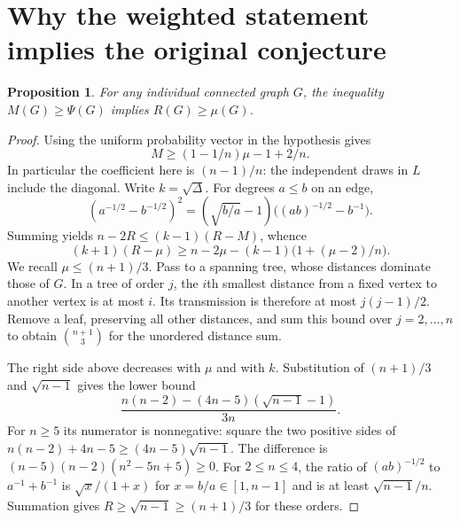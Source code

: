 \documentclass[11pt,a4paper]{article}
\newtheorem{proposition}[theorem]{Proposition}
\begin{document}
\section{Why the weighted statement implies the original conjecture}
\begin{proposition}\label{p11-prop:transfer}
For any individual connected graph $G$, the inequality $M(G)\ge\Psi(G)$ implies $R(G)\ge\mu(G)$.
\end{proposition}
\begin{proof}
Using the uniform probability vector in the hypothesis gives
\[
 M\ge(1-1/n)\mu-1+2/n.
\]
In particular the coefficient here is $(n-1)/n$: the independent draws in $L$ include the diagonal. Write $k=\sqrt\Delta$. For degrees $a\le b$ on an edge,
\[
 (a^{-1/2}-b^{-1/2})^2
 =(\sqrt{b/a}-1)\bigl((ab)^{-1/2}-b^{-1}\bigr).
\]
Summing yields $n-2R\le(k-1)(R-M)$, whence
\[
 (k+1)(R-\mu)\ge n-2\mu-(k-1)\bigl(1+(\mu-2)/n\bigr).
\]
We recall $\mu\le(n+1)/3$. Pass to a spanning tree, whose distances dominate those of $G$. In a tree of order $j$, the $i$th smallest distance from a fixed vertex to another vertex is at most $i$. Its transmission is therefore at most $j(j-1)/2$. Remove a leaf, preserving all other distances, and sum this bound over $j=2,\ldots,n$ to obtain $\binom{n+1}3$ for the unordered distance sum.

The right side above decreases with $\mu$ and with $k$. Substitution of $(n+1)/3$ and $\sqrt{n-1}$ gives the lower bound
\[
 \frac{n(n-2)-(4n-5)(\sqrt{n-1}-1)}{3n}.
\]
For $n\ge5$ its numerator is nonnegative: square the two positive sides of $n(n-2)+4n-5\ge(4n-5)\sqrt{n-1}$. The difference is $(n-5)(n-2)(n^2-5n+5)\ge0$.
For $2\le n\le4$, the ratio of $(ab)^{-1/2}$ to $a^{-1}+b^{-1}$ is $\sqrt{x}/(1+x)$ for $x=b/a\in[1,n-1]$ and is at least $\sqrt{n-1}/n$. Summation gives $R\ge\sqrt{n-1}\ge(n+1)/3$ for these orders.
\end{proof}
\end{document}
